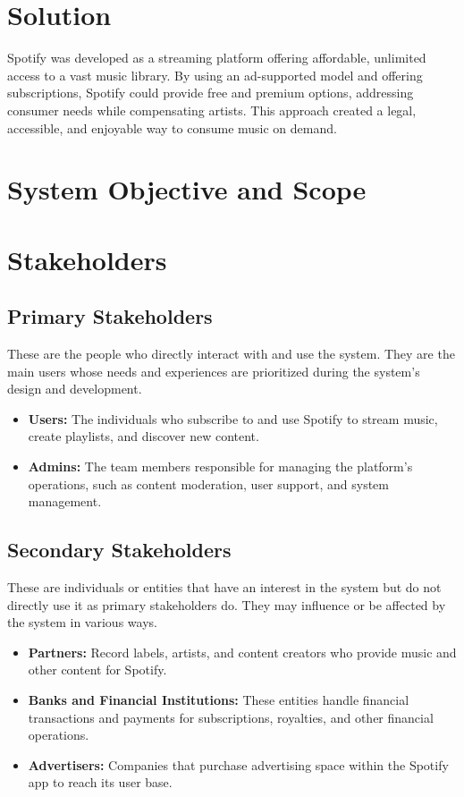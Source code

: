 \documentclass[a4paper,10pt]{article}
\begin{document}
\section{Solution}
Spotify was developed as a streaming platform offering affordable, unlimited access to a vast music library. By using an ad-supported model and offering subscriptions, Spotify could provide free and premium options, addressing consumer needs while compensating artists. This approach created a legal, accessible, and enjoyable way to consume music on demand.

\section{System Objective and Scope}

\section{Stakeholders}
    \subsection{Primary Stakeholders}
    These are the people who directly interact with and use the system. They are the main users whose needs and experiences are prioritized during the system's design and development.

    \begin{itemize}
        \item \textbf{Users:} The individuals who subscribe to and use Spotify to stream music, create playlists, and discover new content.
        \item \textbf{Admins:} The team members responsible for managing the platform’s operations, such as content moderation, user support, and system management.
    \end{itemize}

    \subsection{Secondary Stakeholders}
    These are individuals or entities that have an interest in the system but do not directly use it as primary stakeholders do. They may influence or be affected by the system in various ways.

    \begin{itemize}
        \item \textbf{Partners:} Record labels, artists, and content creators who provide music and other content for Spotify.
        \item \textbf{Banks and Financial Institutions:} These entities handle financial transactions and payments for subscriptions, royalties, and other financial operations.
        \item \textbf{Advertisers:} Companies that purchase advertising space within the Spotify app to reach its user base.
    \end{itemize}
\end{document}
